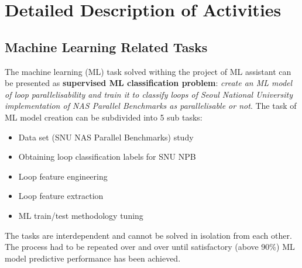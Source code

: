 \documentclass[10pt,a4paper]{report}
\begin{document}
\section{Detailed Description of Activities}
\label{active_description}

\subsection{Machine Learning Related Tasks}
\quad The machine learning (ML) task solved withing the project of ML assistant can be presented as \textbf{supervised ML classification problem}: \textit{create an ML model of loop parallelisability and train it to classify loops of Seoul National University implementation \cite{snu-npb-benchmarks} of NAS Parallel Benchmarks \cite{nasa-parallel-benchmarks} as parallelisable or not}. The task of ML model creation can be subdivided into 5 sub tasks:
\begin{itemize}
\renewcommand\labelitemi{$\bullet$}
\item Data set (SNU NAS Parallel Benchmarks) study
\item Obtaining loop classification labels for SNU NPB
\item Loop feature engineering
\item Loop feature extraction
\item ML train/test methodology tuning
\end{itemize}
\quad The tasks are interdependent and cannot be solved in isolation from each other. The process had to be repeated over and over until satisfactory (above 90\%) ML model predictive performance has been achieved.
\end{document}
